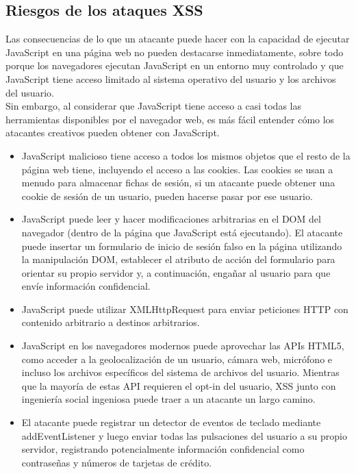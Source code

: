 \subsection{Riesgos de los ataques XSS}

Las consecuencias de lo que un atacante puede hacer con la capacidad de ejecutar JavaScript en una página web no pueden destacarse inmediatamente, sobre todo porque los navegadores ejecutan JavaScript en un entorno muy controlado y que JavaScript tiene acceso limitado al sistema operativo del usuario y los archivos del usuario. \\

Sin embargo, al considerar que JavaScript tiene acceso a casi todas las herramientas disponibles por el navegador web, es más fácil entender cómo los atacantes creativos pueden obtener con JavaScript. \\

\begin{itemize}
    \item JavaScript malicioso tiene acceso a todos los mismos objetos que el resto de la página web tiene, incluyendo el acceso a las cookies. Las cookies se usan a menudo para almacenar fichas de sesión, si un atacante puede obtener una cookie de sesión de un usuario, pueden hacerse pasar por ese usuario.
    \item JavaScript puede leer y hacer modificaciones arbitrarias en el DOM del navegador (dentro de la página que JavaScript está ejecutando). El atacante puede insertar un formulario de inicio de sesión falso en la página utilizando la manipulación DOM, establecer el atributo de acción del formulario para orientar su propio servidor y, a continuación, engañar al usuario para que envíe información confidencial.
    \item JavaScript puede utilizar XMLHttpRequest para enviar peticiones HTTP con contenido arbitrario a destinos arbitrarios.
    \item JavaScript en los navegadores modernos puede aprovechar las APIs HTML5, como acceder a la geolocalización de un usuario, cámara web, micrófono e incluso los archivos específicos del sistema de archivos del usuario. Mientras que la mayoría de estas API requieren el opt-in del usuario, XSS junto con ingeniería social ingeniosa puede traer a un atacante un largo camino.
    \item El atacante puede registrar un detector de eventos de teclado mediante addEventListener y luego enviar todas las pulsaciones del usuario a su propio servidor, registrando potencialmente información confidencial como contraseñas y números de tarjetas de crédito.
\end{itemize}
